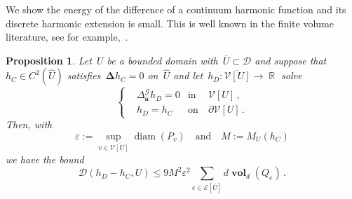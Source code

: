 \documentclass[12pt]{amsart}
\numberwithin{equation}{section}
\DeclareMathOperator{\R}{\mathbb{R}}
\DeclareMathOperator{\diam}{{\mathop{diam}}}
\newtheorem{prop}[theorem]{Proposition}
\newcommand{\V}{\mathcal{V}}
\newcommand{\E}{\mathcal{E}}
\newcommand{\eps}{\varepsilon}
\newcommand{\CLap}{\boldsymbol{\Delta}}
\newcommand{\aDelta}{\hyperref[eq:geometric-laplacian]{{\Delta^{\mathcal{G}}_{\cond}}}}
\newcommand{\cond}{\hyperref[eq:geometric-laplacian]{\mathbf{a}}}
\newcommand{\D}{\hyperref[eq:dir.energy]{\mathcal{D}}}
\newcommand{\GCU}{\hyperref[eq:graph-closure]{\widehat{U}}}
\newcommand{\Qe}{\hyperref[eq:qeset]{Q_e}}
\DeclareMathOperator{\vol}{\mathbf{vol}}
\begin{document}
We show the energy of the difference of a continuum harmonic function and its discrete harmonic extension is small. This is well known in the finite volume literature, see for example,~\cite[Theorem 9.3]{eymard2000finite}.
\begin{prop}
	\label{prop:energy-bound}
	Let~$U$ be a bounded domain with~$\overline{U} \subset \mathcal{D}$ and suppose that~$h_C \in C^{2}(\GCU)$ satisfies~$\CLap h_C = 0$ on~$\GCU$ and let~$h_D: \overline{\V[U]} \to \R$ solve 
	\[
	\left\{
	\begin{aligned}
		&  \aDelta h_D = 0 & \mbox{in} & \ \V[U] \,,
		\\
		& h_D = h_C & \mbox{on} & \  \partial \V[U] \, . 
	\end{aligned}
	\right.
	\]
	Then, with
	\[
	\eps := \sup_{v \in \overline{\V[U]}} \diam(P_v)
	\quad \mbox{and} \quad M := M_U(h_C) 
	\]
	we have the bound
	\begin{equation}
		\label{eq:dirichlet-energy-convergence-bound}
	\D(h_D - h_C, U) \leq 9  M^2 \eps^2 \sum_{e \in \E[\overline{U}]} d \vol_{d}(\Qe)   \, .
	\end{equation}
\end{prop}
\end{document}
